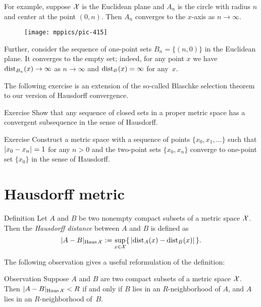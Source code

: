 For example, suppose $\mathcal{X}$ is the Euclidean plane and $A_n$ is the circle with radius $n$ and center at the point $(0,n)$.
Then $A_n$ converges to the $x$-axis as $n\to \infty$.

\begin{figure}[ht!]
\vskip-0mm
\centering
\texttt{[image: mppics/pic-415]}
\end{figure}

Further, consider the sequence of one-point sets $B_n=\{(n,0)\}$ in the Euclidean plane.
It converges to the empty set;
indeed, for any point $x$ we have $\mathrm{dist}_{B_n}(x)\to\infty$ as $n\to \infty$ and $\mathrm{dist}_{\varnothing}(x)= \infty$ for any~$x$.

The following exercise is an extension of the so-called Blaschke selection theorem to our version of Hausdorff convergence.

\begin{thm}{Exercise}\label{ex:generalized-selection}
Show that any sequence of closed sets in a proper metric space has a convergent subsequence in the sense of Hausdorff.
\end{thm}


\begin{thm}{Exercise}\label{ex:two>one}
Construct a metric space with a sequence of points $\{x_0,x_1,\dots\}$ such that $|{x_0}-{x_n}|_{}^{{}}=1$ for any $n>0$ and the two-point sets $\{x_0,x_n\}$ converge to one-point set $\{x_0\}$ in the sense of Hausdorff.
\end{thm}


\section{Hausdorff metric}

\begin{thm}{Definition}\label{def:hausdorff-convergence}
Let $A$ and $B$ be two nonempty compact subsets of a metric space $\mathcal{X}$.
Then the \emph{Hausdorff distance} between $A$ and $B$ is defined as 
$$|A-B|_{\operatorname{\rm Haus}\nolimits\mathcal{X}}
\mathrel{:=}
\sup_{x\in \mathcal{X}}\{\,|\mathrm{dist}_A(x)-\mathrm{dist}_B(x)|\,\}.
$$

\end{thm}

The following observation gives a useful reformulation of the definition:

\begin{thm}{Observation}\label{obs:Haus-nbhds}
Suppose $A$ and $B$ are two compact subsets of a metric space $\mathcal{X}$.
Then $|A-B|_{\operatorname{\rm Haus}\nolimits\mathcal{X}}< R$ if and only if
$B$ lies in an $R$-neighborhood of $A$, 
and 
$A$ lies in an $R$-neighborhood of~$B$.
\end{thm}

